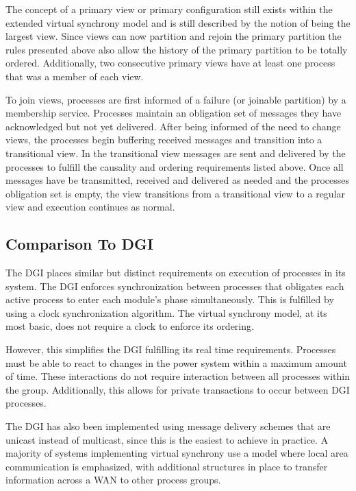 The concept of a primary view or primary configuration still exists within the extended virtual synchrony model and is still described by the notion of being the largest view. Since views can now partition and rejoin the primary partition the rules presented above also allow the history of the primary partition to be totally ordered. Additionally, two consecutive primary views have at least one process that was a member of each view.

To join views, processes are first informed of a failure (or joinable partition) by a membership service. Processes maintain an obligation set of messages they have acknowledged but not yet delivered. After being informed of the need to change views, the processes begin buffering received messages and transition into a transitional view. In the transitional view messages are sent and delivered by the processes to fulfill the causality and ordering requirements listed above. Once all messages have be transmitted, received and delivered as needed and the processes obligation set is empty, the view transitions from a transitional view to a regular view and execution continues as normal.

\subsection{Comparison To DGI}

The DGI places similar but distinct requirements on execution of processes in its system. The DGI enforces synchronization between processes that obligates each active process to enter each module's phase simultaneously. This is fulfilled by using a clock synchronization algorithm. The virtual synchrony model, at its most basic, does not require a clock to enforce its ordering.

However, this simplifies the DGI fulfilling its real time requirements.  Processes must be able to react to changes in the power system within a maximum amount of time. These interactions do not require interaction between all processes within the group. Additionally, this allows for private transactions to occur between DGI processes. 

The DGI has also been implemented using message delivery schemes that are unicast instead of multicast, since this is the easiest to achieve in practice. A majority of systems implementing virtual synchrony use a model where local area communication is emphasized, with additional structures in place to transfer information across a WAN to other process groups.

